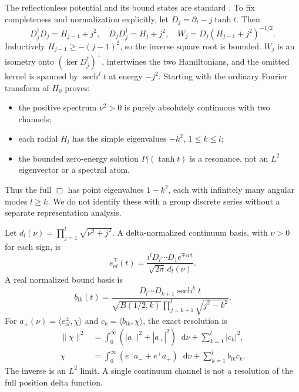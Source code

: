 \documentclass[11pt,a4paper]{article}
\newcommand{\dd}{\mathop{}\!\mathrm d}
\newcommand{\sech}{\operatorname{sech}}
\begin{document}
The reflectionless potential and its bound states are standard
\cite{LMW}. To fix completeness and normalization explicitly, let
$D_j=\partial_t-j\tanh t$. Then
\begin{equation}
 D_j^\dagger D_j=H_{j-1}+j^2,\quad
 D_jD_j^\dagger=H_j+j^2,\quad
 W_j=D_j(H_{j-1}+j^2)^{-1/2}.
\end{equation}
Inductively $H_{j-1}\geq-(j-1)^2$, so the inverse square root is bounded.
$W_j$ is an isometry onto $(\ker D_j^\dagger)^\perp$, intertwines the two
Hamiltonians, and the omitted kernel is spanned by $\sech^jt$ at energy
$-j^2$. Starting with the ordinary Fourier transform of $H_0$ proves:
\begin{itemize}
\item the positive spectrum $\nu^2>0$ is purely absolutely continuous
with two channels;
\item each radial $H_l$ has the simple eigenvalues $-k^2$, $1\leq k\leq l$;
\item the bounded zero-energy solution $P_l(\tanh t)$ is a resonance,
not an $L^2$ eigenvector or a spectral atom.
\end{itemize}
Thus the full $\Box$ has point eigenvalues $1-k^2$, each with infinitely
many angular modes $l\geq k$. We do not identify these with a group
discrete series without a separate representation analysis.

Let $d_l(\nu)=\prod_{j=1}^l\sqrt{\nu^2+j^2}$. A delta-normalized
continuum basis, with $\nu>0$ for each sign, is
\begin{equation}
 e_{\nu l}^{\mp}(t)=
 \frac{i^lD_l\cdots D_1e^{\mp i\nu t}}{\sqrt{2\pi}\,d_l(\nu)}.
\end{equation}
A real normalized bound basis is
\begin{equation}
 b_{lk}(t)=
 \frac{D_l\cdots D_{k+1}\sech^kt}
 {\sqrt{B(1/2,k)}\prod_{j=k+1}^l\sqrt{j^2-k^2}}.
\end{equation}
For $a_\pm(\nu)=\langle e^\pm_{\nu l},\chi\rangle$ and
$c_k=\langle b_{lk},\chi\rangle$, the exact resolution is
\begin{align}
 \|\chi\|^2&=\int_0^\infty(|a_-|^2+|a_+|^2)\dd\nu+
                 \sum_{k=1}^l|c_k|^2,\\
 \chi&=\int_0^\infty(e^-a_-+e^+a_+)\dd\nu+\sum_{k=1}^lb_{lk}c_k .
\end{align}
The inverse is an $L^2$ limit. A single continuum channel is not a
resolution of the full position delta function.
\end{document}
